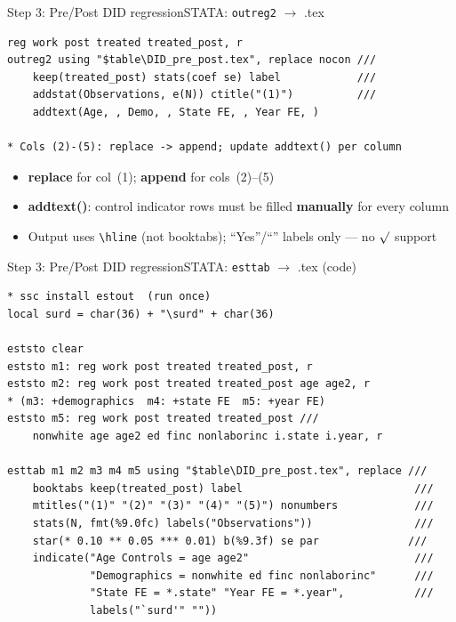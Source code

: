 \documentclass[dvipsnames,hyperref={pdfpagelabels=false}]{beamer}
\begin{document}
\begin{frame}[fragile]{Step 3: Pre/Post DID regression}{STATA: \texttt{outreg2} $\to$ .tex}
\begin{lstlisting}
reg work post treated treated_post, r
outreg2 using "$table\DID_pre_post.tex", replace nocon ///
    keep(treated_post) stats(coef se) label            ///
    addstat(Observations, e(N)) ctitle("(1)")          ///
    addtext(Age, , Demo, , State FE, , Year FE, )

* Cols (2)-(5): replace -> append; update addtext() per column
\end{lstlisting}
\begin{itemize}
    \item \textbf{replace} for col~(1); \textbf{append} for cols~(2)--(5)
    \vspace{0.15cm}
    \item \textbf{addtext()}: control indicator rows must be filled \textbf{manually} for every column
    \vspace{0.15cm}
    \item Output uses \texttt{\textbackslash hline} (not booktabs); ``Yes''/``'' labels only — no $\surd$ support
\end{itemize}
\end{frame}

\begin{frame}[fragile]{Step 3: Pre/Post DID regression}{STATA: \texttt{esttab} $\to$ .tex (code)}
\begin{lstlisting}
* ssc install estout  (run once)
local surd = char(36) + "\surd" + char(36)

eststo clear
eststo m1: reg work post treated treated_post, r
eststo m2: reg work post treated treated_post age age2, r
* (m3: +demographics  m4: +state FE  m5: +year FE)
eststo m5: reg work post treated treated_post ///
    nonwhite age age2 ed finc nonlaborinc i.state i.year, r

esttab m1 m2 m3 m4 m5 using "$table\DID_pre_post.tex", replace ///
    booktabs keep(treated_post) label                           ///
    mtitles("(1)" "(2)" "(3)" "(4)" "(5)") nonumbers            ///
    stats(N, fmt(%9.0fc) labels("Observations"))                ///
    star(* 0.10 ** 0.05 *** 0.01) b(%9.3f) se par              ///
    indicate("Age Controls = age age2"                          ///
             "Demographics = nonwhite ed finc nonlaborinc"      ///
             "State FE = *.state" "Year FE = *.year",           ///
             labels("`surd'" ""))
\end{lstlisting}
\end{frame}
\end{document}
